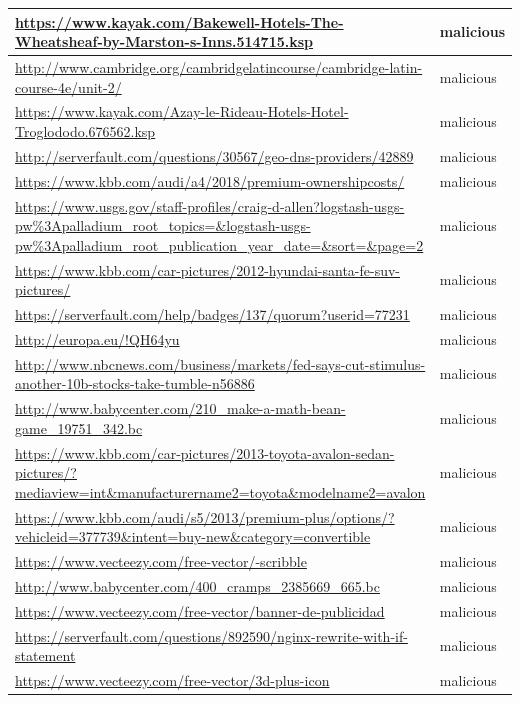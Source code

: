 \documentclass[12pt,twoside]{report}
\begin{document}
\begin{spacing}{1}
\begin{center}
\begin{longtable}{ |>{\raggedright\arraybackslash}p{}|>{\raggedright\arraybackslash}p{}| }
\\
\hline
\url{https://www.kayak.com/Bakewell-Hotels-The-Wheatsheaf-by-Marston-s-Inns.514715.ksp} & malicious
\\
\hline
\url{http://www.cambridge.org/cambridgelatincourse/cambridge-latin-course-4e/unit-2/} & malicious
\\
\hline
\url{https://www.kayak.com/Azay-le-Rideau-Hotels-Hotel-Troglododo.676562.ksp} & malicious
\\
\hline
\url{http://serverfault.com/questions/30567/geo-dns-providers/42889} & malicious
\\
\hline
\url{https://www.kbb.com/audi/a4/2018/premium-ownershipcosts/} & malicious
\\
\hline
\url{https://www.usgs.gov/staff-profiles/craig-d-allen?logstash-usgs-pw\%3Apalladium_root_topics=&logstash-usgs-pw\%3Apalladium_root_publication_year_date=&sort=&page=2} & malicious
\\
\hline
\url{https://www.kbb.com/car-pictures/2012-hyundai-santa-fe-suv-pictures/} & malicious
\\
\hline
\url{https://serverfault.com/help/badges/137/quorum?userid=77231} & malicious
\\
\hline
\url{http://europa.eu/!QH64yu} & malicious
\\
\hline
\url{http://www.nbcnews.com/business/markets/fed-says-cut-stimulus-another-10b-stocks-take-tumble-n56886} & malicious
\\
\hline
\url{http://www.babycenter.com/210_make-a-math-bean-game_19751_342.bc} & malicious
\\
\hline
\url{https://www.kbb.com/car-pictures/2013-toyota-avalon-sedan-pictures/?mediaview=int&manufacturername2=toyota&modelname2=avalon} & malicious
\\
\hline
\url{https://www.kbb.com/audi/s5/2013/premium-plus/options/?vehicleid=377739&intent=buy-new&category=convertible} & malicious
\\
\hline
\url{https://www.vecteezy.com/free-vector/-scribble} & malicious
\\
\hline
\url{http://www.babycenter.com/400_cramps_2385669_665.bc} & malicious
\\
\hline
\url{https://www.vecteezy.com/free-vector/banner-de-publicidad} & malicious
\\
\hline
\url{https://serverfault.com/questions/892590/nginx-rewrite-with-if-statement} & malicious
\\
\hline
\url{https://www.vecteezy.com/free-vector/3d-plus-icon} & malicious
\\

\end{longtable}
\end{center}
\end{spacing}
\end{document}
